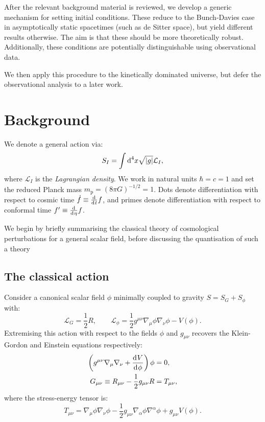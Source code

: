 After the relevant background material is reviewed, we develop a generic mechanism for setting initial conditions. These reduce to the Bunch-Davies case in asymptotically static spacetimes (such as de Sitter space), but yield different results otherwise. The aim is that these should be more theoretically robust. Additionally, these conditions are potentially distinguishable using observational data.

We then apply this procedure to the kinetically dominated universe, but defer the observational analysis to a later work.



\section{Background}
\label{sec:background}

We denote a general action via:
\begin{equation}
  S_I = \int \d[4]{x}\sqrt{|g|}\mathcal{L}_I,
  \label{eqn:general_action}
\end{equation}
where \(\mathcal{L}_I\) is the {\em Lagrangian density}. We work in natural units \(\hbar=c=1\) and set the reduced Planck mass \(m_\mathrm{p} = {(8\pi G)}^{-1/2} = 1\). Dots denote differentiation with respect to cosmic time \(\dot{f}\equiv \frac{\operatorname{d}^{}\!{}}{\operatorname{d}^{}\!{t}}f\), and primes denote differentiation with respect to conformal time \({{f}^\prime}\equiv\frac{\operatorname{d}^{}\!{}}{\operatorname{d}^{}\!{\eta}}f\).

We begin by briefly summarising the classical theory of cosmological perturbations for a general scalar field, before discussing the quantisation of such a theory


\subsection{The classical action}
\label{sec:inflation}
Consider \citep{Baumann+2009} a canonical scalar field \(\phi\) minimally coupled to gravity \(S= S_G + S_\phi\) with:
\begin{equation}
  \mathcal{L}_G = \frac{1}{2}R, 
  \qquad
  \mathcal{L}_\phi = \frac{1}{2}g^{\mu\nu}\nabla_\mu\phi\nabla_\nu\phi - V(\phi).
  \label{eqn:action}
\end{equation}
Extremising this action with respect to the fields \(\phi\) and \(g_{\mu\nu}\) recovers the Klein-Gordon and Einstein equations respectively:
\begin{align}
  \left( g^{\mu\nu}\nabla_\mu\nabla_\nu + \frac{\d{V}}{\d{\phi}} \right) \phi &= 0,
  \label{eqn:klein_gordon}\\
  G_{\mu\nu}\equiv R_{\mu\nu}-\frac{1}{2}g_{\mu\nu}R&= T_{\mu\nu},
  \label{eqn:einstein}
\end{align}
where the stress-energy tensor is:
\begin{equation}
  T_{\mu\nu} = \nabla_\mu\phi \nabla_\nu\phi - \frac{1}{2}g_{\mu\nu} \nabla_\alpha\phi \nabla^\alpha\phi +g_{\mu\nu} V(\phi).
  \label{eqn:SET}
\end{equation}

